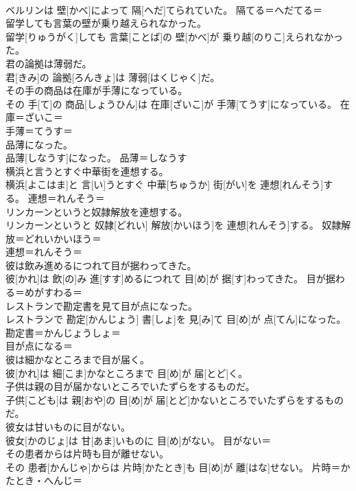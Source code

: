 \documentclass[8pt]{extreport}
\begin{document}
\begin{CJK}{UTF8}{min}
{\\	ベルリンは 壁[かべ]によって 隔[へだ]てられていた。	隔てる＝へだてる＝ 
\\	留学しても言葉の壁が乗り越えられなかった。	
\\	留学[りゅうがく]しても 言葉[ことば]の 壁[かべ]が 乗り越[のりこ]えられなかった。	
\\	君の論拠は薄弱だ。	
\\	君[きみ]の 論拠[ろんきょ]は 薄弱[はくじゃく]だ。	
\\	その手の商品は在庫が手薄になっている。	
\\	その 手[て]の 商品[しょうひん]は 在庫[ざいこ]が 手薄[てうす]になっている。	在庫＝ざいこ＝ 
\\	手薄＝てうす＝ 
\\	品薄になった。	
\\	品薄[しなうす]になった。	品薄＝しなうす
\\	横浜と言うとすぐ中華街を連想する。	
\\	横浜[よこはま]と 言[い]うとすぐ 中華[ちゅうか] 街[がい]を 連想[れんそう]する。	連想＝れんそう＝ 
\\	リンカーンというと奴隷解放を連想する。	
\\	リンカーンというと 奴隷[どれい] 解放[かいほう]を 連想[れんそう]する。	奴隷解放＝どれいかいほう＝ 
\\	連想＝れんそう＝ 
\\	彼は飲み進めるにつれて目が据わってきた。	
\\	彼[かれ]は 飲[の]み 進[すす]めるにつれて 目[め]が 据[す]わってきた。	目が据わる＝めがすわる＝ 
\\	レストランで勘定書を見て目が点になった。	
\\	レストランで 勘定[かんじょう] 書[しょ]を 見[み]て 目[め]が 点[てん]になった。	勘定書＝かんじょうしょ＝ 
\\	目が点になる＝ 
\\	彼は細かなところまで目が届く。	
\\	彼[かれ]は 細[こま]かなところまで 目[め]が 届[とど]く。	
\\	子供は親の目が届かないところでいたずらをするものだ。	
\\	子供[こども]は 親[おや]の 目[め]が 届[とど]かないところでいたずらをするものだ。	
\\	彼女は甘いものに目がない。	
\\	彼女[かのじょ]は 甘[あま]いものに 目[め]がない。	目がない＝ 
\\	その患者からは片時も目が離せない。	
\\	その 患者[かんじゃ]からは 片時[かたとき]も 目[め]が 離[はな]せない。	片時＝かたとき・へんじ＝ 
}
\end{CJK}
\end{document}
